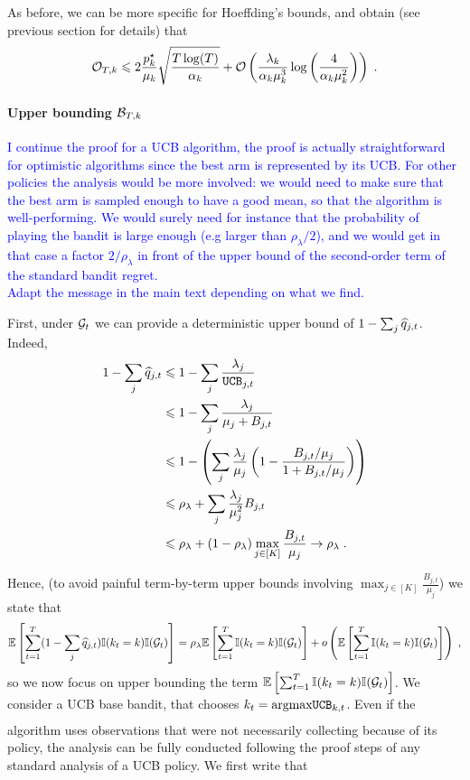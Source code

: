 As before, we can be more specific for Hoeffding's bounds, and obtain (see previous section for details) that
\[ \mathcal{O}_{T,k} \leqslant 2\frac{p_k^\star}{\mu_k}\sqrt{\frac{T\log(T)}{\alpha_k}} + \mathcal{O}\left(\frac{\lambda_k}{\alpha_k \mu_k^3}\log\left(\frac{4}{\alpha_k \mu_k^2}\right)\right)  \;. \]

\paragraph{Upper bounding $\mathcal{B}_{T, k}$} \textcolor{blue}{I continue the proof for a UCB algorithm, the proof is actually straightforward for optimistic algorithms since the best arm is represented by its UCB. For other policies the analysis would be more involved: we would need to make sure that the best arm is sampled enough to have a good mean, so that the algorithm is well-performing. We would surely need for instance that the probability of playing the bandit is large enough (e.g larger than $\rho_\lambda/2$), and we would get in that case a factor $2/\rho_\lambda$ in front of the upper bound of the second-order term of the standard bandit regret.\\
Adapt the message in the main text depending on what we find.}

First, under $\mathcal{G}_t$ we can provide a deterministic upper bound of $1-\sum_j \widehat{q}_{j,t} $. Indeed,
\begin{align*}
1-\sum_j \widehat{q}_{j,t} & \leqslant 1 - \sum_j \frac{\lambda_j}{\texttt{UCB}_{j,t}} \\
& \leqslant 1- \sum_j \frac{\lambda_j}{\mu_j + B_{j,t}} \\
& \leqslant 1- \left(\sum_j \frac{\lambda_j}{\mu_j}\left(1- \frac{B_{j, t}/\mu_j}{1+B_{j,t}/\mu_j}\right) \right) \\
& \leqslant \rho_\lambda + \sum_j \frac{\lambda_j}{\mu_j^2} B_{j,t}\\
&\leqslant \rho_\lambda + (1-\rho_\lambda)\max_{j \in[K]} \frac{B_{j,t}}{\mu_j} \to \rho_\lambda \;.
\end{align*}

Hence, (to avoid painful term-by-term upper bounds involving $\max_{j \in[K]} \frac{B_{j,t}}{\mu_j}$) we state that \[\mathbb{E}\left[\sum_{t=1}^T (1-\sum_j \widehat{q}_{j, t}) \mathbb{I}(k_t=k)\mathbb{I}(\mathcal{G}_t)\right] = \rho_\lambda \mathbb{E}\left[\sum_{t=1}^T \mathbb{I}(k_t=k)\mathbb{I}(\mathcal{G}_t)\right] + o\left(\mathbb{E}\left[\sum_{t=1}^T \mathbb{I}(k_t=k)\mathbb{I}(\mathcal{G}_t)\right]\right)\;, \]
so we now focus on upper bounding the term $\mathbb{E}\left[\sum_{t=1}^T \mathbb{I}(k_t=k)\mathbb{I}(\mathcal{G}_t)\right]$. We consider a UCB base bandit, that chooses $k_t = \underset{}{\text{argmax}} \texttt{UCB}_{k, t}$. Even if the algorithm uses observations that were not necessarily collecting because of its policy, the analysis can be fully conducted following the proof steps of any standard analysis of a UCB policy.  We first write that

